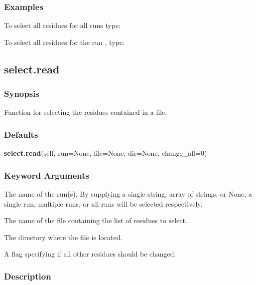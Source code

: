 \subsubsection{Examples}

To select all residues for all runs type:



To select all residues for the run , type:






\newpage

\subsection{select.read}


\subsubsection{Synopsis}

Function for selecting the residues contained in a file.



\subsubsection{Defaults}

\textsf{\textbf{select.read}(self, run=None, file=None, dir=None, change\_all=0)}


\subsubsection{Keyword Arguments}

  The name of the run(s).  By supplying a single string, array of strings, or None, a single run, multiple runs, or all runs will be selected respectively. 

  The name of the file containing the list of residues to select. 

  The directory where the file is located. 

  A flag specifying if all other residues should be changed. 




\subsubsection{Description}


